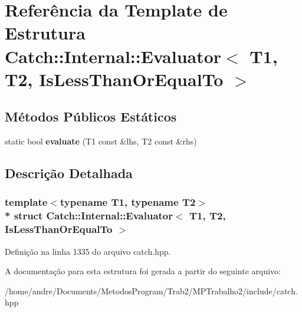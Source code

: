 \hypertarget{structCatch_1_1Internal_1_1Evaluator_3_01T1_00_01T2_00_01IsLessThanOrEqualTo_01_4}{}\section{Referência da Template de Estrutura Catch\+:\+:Internal\+:\+:Evaluator$<$ T1, T2, Is\+Less\+Than\+Or\+Equal\+To $>$}
\label{structCatch_1_1Internal_1_1Evaluator_3_01T1_00_01T2_00_01IsLessThanOrEqualTo_01_4}
\subsection*{Métodos Públicos Estáticos}
\begin{DoxyCompactItemize}
\item 
static bool {\bfseries evaluate} (T1 const \&lhs, T2 const \&rhs)\hypertarget{structCatch_1_1Internal_1_1Evaluator_3_01T1_00_01T2_00_01IsLessThanOrEqualTo_01_4_adf269a597e4d82d69f29bcb516297b9b}{}\label{structCatch_1_1Internal_1_1Evaluator_3_01T1_00_01T2_00_01IsLessThanOrEqualTo_01_4_adf269a597e4d82d69f29bcb516297b9b}

\end{DoxyCompactItemize}


\subsection{Descrição Detalhada}
\subsubsection*{template$<$typename T1, typename T2$>$\\*
struct Catch\+::\+Internal\+::\+Evaluator$<$ T1, T2, Is\+Less\+Than\+Or\+Equal\+To $>$}



Definição na linha 1335 do arquivo catch.\+hpp.



A documentação para esta estrutura foi gerada a partir do seguinte arquivo\+:\begin{DoxyCompactItemize}
\item 
/home/andre/\+Documents/\+Metodos\+Program/\+Trab2/\+M\+P\+Trabalho2/include/catch.\+hpp\end{DoxyCompactItemize}
